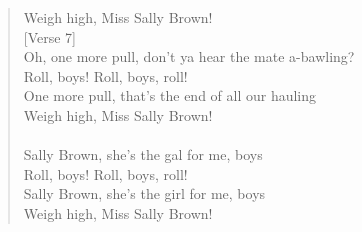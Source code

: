\documentclass[11pt]{article}
\begin{document}
\begin{verse}
Weigh high, Miss Sally Brown!\\
\vspace*{1em}
[Verse 7]\\
Oh, one more pull, don't ya hear the mate a-bawling?\\
Roll, boys! Roll, boys, roll!\\
One more pull, that's the end of all our hauling\\
Weigh high, Miss Sally Brown!\\
[Verse 8]\\
Sally Brown, she's the gal for me, boys\\
Roll, boys! Roll, boys, roll!\\
Sally Brown, she's the girl for me, boys\\
Weigh high, Miss Sally Brown!\\
\end{verse}
\clearpage
\end{document}

